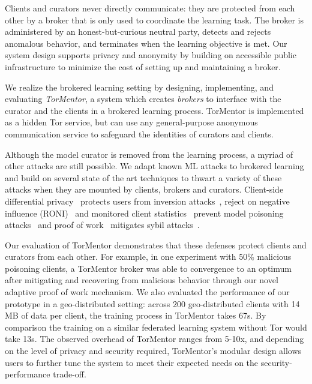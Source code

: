 Clients and curators never directly communicate: they are protected
from each other by a broker that is only used to coordinate the
learning task. The broker is administered by an honest-but-curious
neutral party, detects and rejects anomalous behavior, and terminates
when the learning objective is met. Our system design supports privacy
and anonymity by building on accessible public infrastructure to
minimize the cost of setting up and maintaining a broker.

We realize the brokered learning setting by designing, implementing,
and evaluating \emph{TorMentor}, a system which creates \emph{brokers}
to interface with the curator and the clients
in a brokered learning process. TorMentor is
implemented as a hidden Tor service, but can use any general-purpose
anonymous communication service to safeguard the identities of
curators and clients. %


Although the model curator is removed from the learning process, a
myriad of other attacks are still possible. We adapt known ML attacks
to brokered learning and build on several state of the art techniques
to thwart a variety of these attacks when they are mounted by clients,
brokers and curators. Client-side differential
privacy~\cite{Dwork:2014, Geyer:2017} protects users from inversion
attacks~\cite{Fredrikson:2014, Fredrikson:2015}, reject on negative
influence (RONI)~\cite{Barreno:2010} and monitored client
statistics~\cite{Mozaffari-Kermani:2015} prevent model poisoning
attacks~\cite{Biggio:2012, Huang:2011} and proof of
work~\cite{Back:2002} mitigates sybil attacks~\cite{Douceur:2002}.

Our evaluation of TorMentor demonstrates that these defenses protect
clients and curators from each other. For example, in one experiment
with 50\% malicious poisoning clients, a TorMentor broker was able to
convergence to an optimum after mitigating and recovering from 
malicious behavior through our novel adaptive proof of work mechanism.
We also evaluated the performance of our prototype in a geo-distributed
setting: across 200 geo-distributed clients with 14 MB of data
per client, the training process in TorMentor takes 67s. By
comparison the training on a similar federated learning system without
Tor would take 13s. The observed overhead of TorMentor ranges from
5-10x, and depending on the level of privacy and security required,
TorMentor's modular design allows users to further tune the system to
meet their expected needs on the security-performance trade-off.

